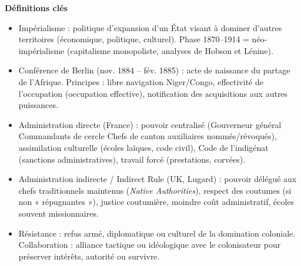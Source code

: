 \documentclass[11pt]{article}
\newcommand{\cle}[1]{{\popxbold\color{popdark}#1}}
\begin{document}
\begin{aretenir}

\textbf{Définitions clés}
\begin{itemize}
  \item \cle{Impérialisme} : politique d'expansion d'un État visant à dominer d'autres territoires (économique, politique, culturel). Phase 1870--1914 = \cle{néo-impérialisme} (capitalisme monopoliste, analyses de Hobson et Lénine).
  \item \cle{Conférence de Berlin} (nov. 1884 -- fév. 1885) : acte de naissance du partage de l'Afrique. Principes : libre navigation Niger/Congo, effectivité de l'occupation (occupation effective), notification des acquisitions aux autres puissances.
  \item \cle{Administration directe} (France) : pouvoir centralisé (Gouverneur général \rightarrow Commandants de cercle \rightarrow Chefs de canton auxiliaires nommés/révoqués), assimilation culturelle (écoles laïques, code civil), Code de l'indigénat (sanctions administratives), travail forcé (prestations, corvées).
  \item \cle{Administration indirecte} / \cle{Indirect Rule} (UK, Lugard) : pouvoir délégué aux chefs traditionnels maintenus (\emph{Native Authorities}), respect des coutumes (si non « répugnantes »), justice coutumière, moindre coût administratif, écoles souvent missionnaires.
  \item \cle{Résistance} : refus armé, diplomatique ou culturel de la domination coloniale. \cle{Collaboration} : alliance tactique ou idéologique avec le colonisateur pour préserver intérêts, autorité ou survivre.
\end{itemize}


\end{aretenir}
\end{document}
